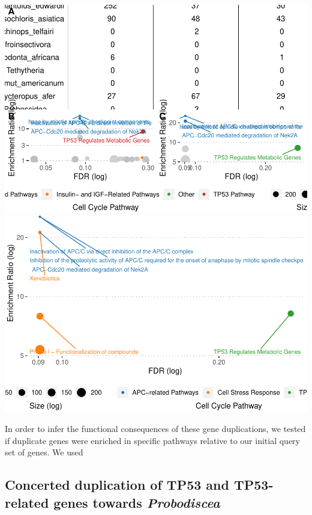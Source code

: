 \documentclass[10pt,letterpaper]{article}
\begin{document}
\includegraphics{paper_PLOS_draft_files/figure-latex/Fig 3-1.pdf}
\includegraphics{paper_PLOS_draft_files/figure-latex/Fig 3-2.pdf}

In order to infer the functional consequences of these gene
duplications, we tested if duplicate genes were enriched in specific
pathways relative to our initial query set of genes. We used

\hypertarget{concerted-duplication-of-tp53-and-tp53-related-genes-towards-probodiscea}{%
\subsection{\texorpdfstring{Concerted duplication of TP53 and
TP53-related genes towards
\emph{Probodiscea}}{Concerted duplication of TP53 and TP53-related genes towards Probodiscea}}\label{concerted-duplication-of-tp53-and-tp53-related-genes-towards-probodiscea}}
\end{document}

